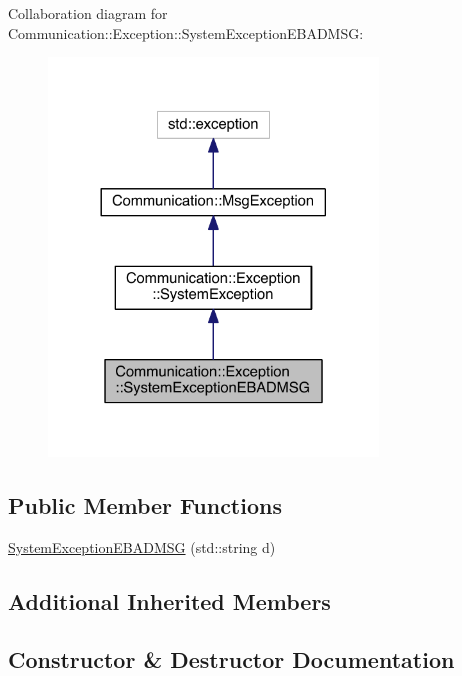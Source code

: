 Collaboration diagram for Communication\+:\+:Exception\+:\+:System\+Exception\+E\+B\+A\+D\+M\+S\+G\+:\nopagebreak
\begin{figure}[H]
\begin{center}
\leavevmode
\includegraphics[width=248pt]{class_communication_1_1_exception_1_1_system_exception_e_b_a_d_m_s_g__coll__graph}
\end{center}
\end{figure}
\subsection*{Public Member Functions}
\begin{DoxyCompactItemize}
\item 
\hyperlink{class_communication_1_1_exception_1_1_system_exception_e_b_a_d_m_s_g_aeebf4ce50c96a90585e6d444c92e34c8}{System\+Exception\+E\+B\+A\+D\+M\+S\+G} (std\+::string d)
\end{DoxyCompactItemize}
\subsection*{Additional Inherited Members}


\subsection{Constructor \& Destructor Documentation}
\hypertarget{class_communication_1_1_exception_1_1_system_exception_e_b_a_d_m_s_g_aeebf4ce50c96a90585e6d444c92e34c8}{}
